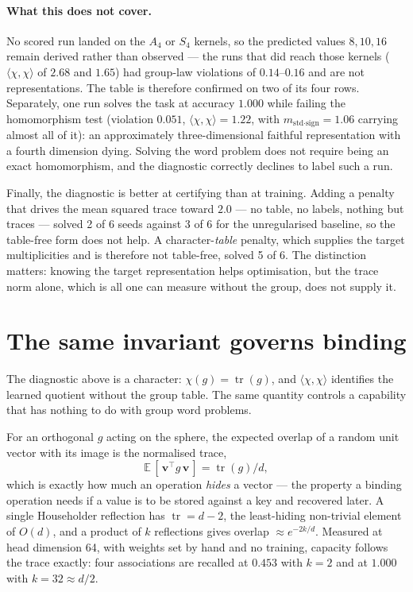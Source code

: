 \documentclass[10pt]{article}
\newcommand{\bv}{\mathbf{v}}
\begin{document}
\paragraph{What this does not cover.} No scored run landed on the $A_4$ or $S_4$ kernels, so the
predicted values $8,10,16$ remain derived rather than observed --- the runs that did reach those
kernels ($\langle\chi,\chi\rangle$ of $2.68$ and $1.65$) had group-law violations of $0.14$--$0.16$
and are not representations. The table is therefore confirmed on two of its four rows. Separately,
one run solves the task at accuracy $1.000$ while failing the homomorphism test (violation $0.051$,
$\langle\chi,\chi\rangle=1.22$, with $m_{\text{std}\cdot\text{sign}}=1.06$ carrying almost all of it):
an approximately three-dimensional faithful representation with a fourth dimension dying. Solving the
word problem does not require being an exact homomorphism, and the diagnostic correctly declines to
label such a run.

Finally, the diagnostic is better at certifying than at training. Adding a penalty that drives the
mean squared trace toward $2.0$ --- no table, no labels, nothing but traces --- solved 2 of 6 seeds
against 3 of 6 for the unregularised baseline, so the table-free form does not help. A
character-\emph{table} penalty, which supplies the target multiplicities and is therefore not
table-free, solved 5 of 6. The distinction matters: knowing the target representation helps
optimisation, but the trace norm alone, which is all one can measure without the group, does not
supply it.

\section{The same invariant governs binding}
\label{sec:binding}

The diagnostic above is a character: $\chi(g)=\operatorname{tr}(g)$, and $\langle\chi,\chi\rangle$
identifies the learned quotient without the group table. The same quantity controls a capability that
has nothing to do with group word problems.

For an orthogonal $g$ acting on the sphere, the expected overlap of a random unit vector with its
image is the normalised trace,
\[
  \mathbb{E}\,[\,\bv^\top g\,\bv\,] = \operatorname{tr}(g)/d ,
\]
which is exactly how much an operation \emph{hides} a vector --- the property a binding operation
needs if a value is to be stored against a key and recovered later. A single Householder reflection
has $\operatorname{tr}=d-2$, the least-hiding non-trivial element of $O(d)$, and a product of $k$
reflections gives overlap $\approx e^{-2k/d}$. Measured at head dimension 64, with weights set by hand
and no training, capacity follows the trace exactly: four associations are recalled at $0.453$ with
$k=2$ and at $1.000$ with $k=32\approx d/2$.
\end{document}
